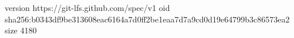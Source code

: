 version https://git-lfs.github.com/spec/v1
oid sha256:b0343df9be313608eac6164a7d0ff2be1eaa7d7a9cd0d19e64799b3c86573ea2
size 4180
